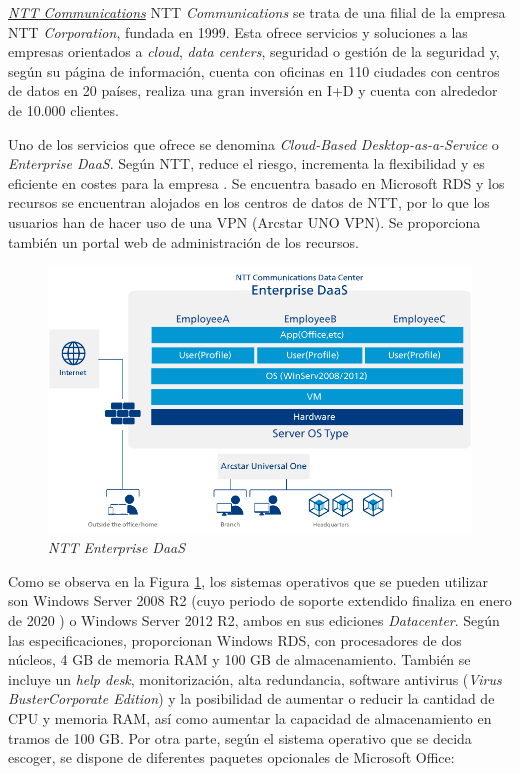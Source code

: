 \noindent\underline{\textit{\acf{NTT} Communications}}\newline
\indent \acs{NTT} \textit{Communications} se trata de una filial de la empresa \acs{NTT} \textit{Corporation}, fundada en 1999. Esta ofrece servicios y soluciones a las empresas orientados a \textit{cloud}, \textit{data centers}, seguridad o gestión de la seguridad \cite{nttcommunications} y, según su página de información, cuenta con oficinas en 110 ciudades con centros de datos en 20 países, realiza una gran inversión en I+D y cuenta con alrededor de 10.000 clientes.

\clearpage

Uno de los servicios que ofrece se denomina \textit{Cloud-Based Desktop-as-a-Service} o \textit{Enterprise \acs{DaaS}}. Según \acs{NTT}, reduce el riesgo, incrementa la flexibilidad y es eficiente en costes para la empresa \cite{nttdaas}. Se encuentra basado en Microsoft \acs{RDS} y los recursos se encuentran alojados en los centros de datos de \acs{NTT}, por lo que los usuarios han de hacer uso de una \acs{VPN} (Arcstar UNO VPN). Se proporciona también un portal web de administración de los recursos.
 
\begin{figure}[h]
    \centering
    \includegraphics[width=0.8\linewidth]{figures/images/ntt_daas.png}
    \caption{\textit{\acs{NTT} Enterprise \acs{DaaS}}}
    \label{fig:ntt_daas}
\end{figure}

Como se observa en la Figura \ref{fig:ntt_daas}, los sistemas operativos que se pueden utilizar son Windows Server 2008 R2 (cuyo periodo de soporte extendido finaliza en enero de 2020 \cite{microsoftwserver2008}) o Windows Server 2012 R2, ambos en sus ediciones \textit{Datacenter}. Según las especificaciones, proporcionan Windows \acs{RDS}, con procesadores de dos núcleos, 4 \acs{GB} de memoria \acs{RAM} y 100 \acs{GB} de almacenamiento. También se incluye un \textit{help desk}, monitorización, alta redundancia, software antivirus (\textit{Virus Buster\texttrademark Corporate Edition}) y la posibilidad de aumentar o reducir la cantidad de \acs{CPU} y memoria \acs{RAM}, así como aumentar la capacidad de almacenamiento en tramos de 100 \acs{GB}. Por otra parte, según el sistema operativo que se decida escoger, se dispone de diferentes paquetes opcionales de Microsoft Office:

